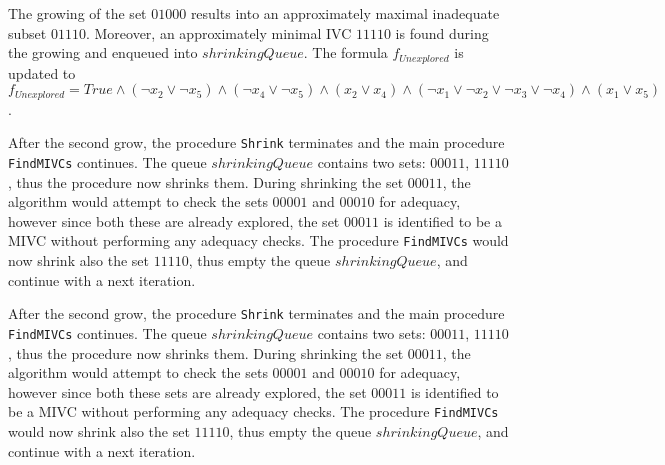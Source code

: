 The growing of the set $01000$ results into an approximately maximal inadequate subset $01110$. Moreover, an approximately minimal IVC $11110$ is found during the growing and enqueued into $\mathit{shrinkingQueue}$. The formula $f_{\mathit{Unexplored}}$ is updated to $f_{\mathit{Unexplored}} = \mathit{True} \wedge (\neg x_2 \vee \neg x_5) \wedge	(\neg x_4 \vee \neg x_5) \wedge (x_2 \vee x_4) \wedge (\neg x_1 \vee \neg x_2 \vee \neg x_3 \vee \neg x_4) \wedge (x_1 \vee x_5)$.

After the second grow, the procedure \texttt{Shrink} terminates and the main procedure \texttt{FindMIVCs} continues. The queue $\mathit{shrinkingQueue}$ contains two sets: $00011$, $11110$, thus the procedure now shrinks them. During shrinking the set $00011$, the algorithm would attempt to check the sets $00001$ and $00010$ for adequacy, however since both these are already explored, the set $00011$ is identified to be a MIVC without performing any adequacy checks. The procedure \texttt{FindMIVCs} would now shrink also the set $11110$, thus empty the queue $\mathit{shrinkingQueue}$, and continue with a next iteration.

After the second grow, the procedure \texttt{Shrink} terminates and the main procedure \texttt{FindMIVCs} continues. The queue $\mathit{shrinkingQueue}$ contains two sets: $00011$, $11110$, thus the procedure now shrinks them. During shrinking the set $00011$, the algorithm would attempt to check the sets $00001$ and $00010$ for adequacy, however since both these sets are already explored, the set $00011$ is identified to be a MIVC without performing any adequacy checks. The procedure \texttt{FindMIVCs} would now shrink also the set $11110$, thus empty the queue $\mathit{shrinkingQueue}$, and continue with a next iteration. 